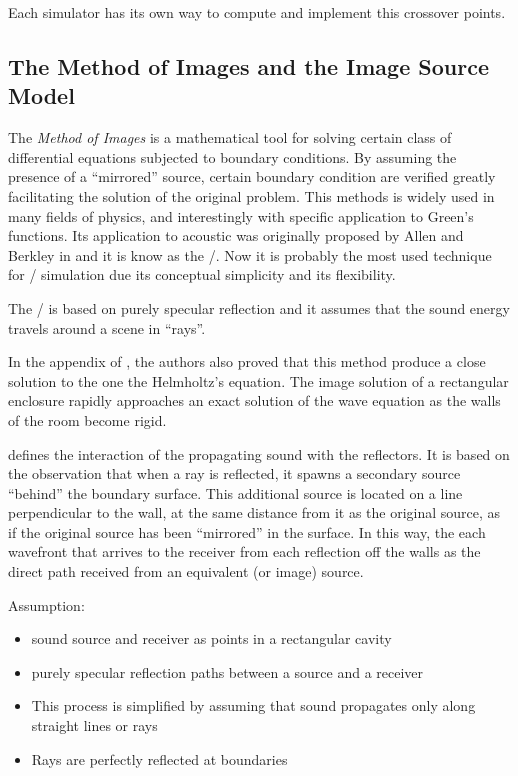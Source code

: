 Each simulator has its own way to compute and implement this crossover points.

\subsection{The Method of Images and the Image Source Model}

The \textit{Method of Images} is a mathematical tool for solving certain class of differential equations subjected to boundary conditions.
By assuming the presence of a ``mirrored'' source, certain boundary condition are verified greatly facilitating the solution of the original problem.
This methods is widely used in many fields of physics, and interestingly with specific application to Green's functions.
Its application to acoustic was originally proposed by Allen and Berkley in \cite{allen1979image} and it is know as the \ISMf/.
Now it is probably the most used technique for \RIR/ simulation due its conceptual simplicity and its flexibility.

The \ISM/ is based on purely specular reflection and it assumes that the sound energy travels around a scene in “rays”.

In the appendix of \cite{allen1979image}, the authors also proved that this method produce a close solution to the one the Helmholtz's equation.
The image solution of a rectangular enclosure
rapidly approaches an exact solution of the wave equation as the walls of the room become rigid.

 defines the interaction of the propagating sound with the reflectors.
It is based on the observation that when a ray is reflected, it spawns a secondary source “behind” the boundary surface.
This additional source is located on a line perpendicular to the wall, at the same distance from it as the original source, as if the original source has been “mirrored” in the surface.
In this way, the each wavefront that arrives to the receiver from each reflection off the walls as the direct path received from an equivalent (or image) source.

Assumption:
\begin{itemize}
    \item sound source and receiver as points in a rectangular cavity
    \item purely specular reflection paths between a source and a receiver
    \item This process is simplified by assuming that sound propagates only along straight lines or rays
    \item Rays are perfectly reflected at boundaries
\end{itemize}

